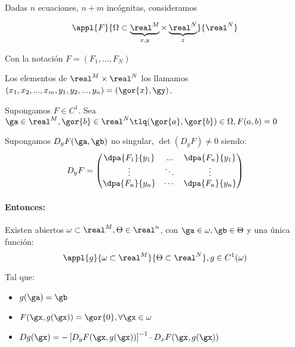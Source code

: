 \begin{theorem}

Dadas $n$ ecuaciones, $n+m$ incógnitas, consideramos 

$$\appl{F}{\Omega\subset\underbrace{\real^M}_{x,y} \times \underbrace{\real^N}_{z}}{\real^N}$$

Con la notación $F = (F_1,...,F_N)$

Los elementos de $\real^M\times\real^N$ los llamamos $(x_1,x_2,...,x_m,y_1,y_2,...,y_n) = (\gor{x},\gy)$.

Supongamos $F\in C^1$. Sea $\ga \in \real^M, \gor{b} \in \real^N \tlq (\gor{a},\gor{b})\in \Omega , F(a,b)=0$

Supongamos $D_yF(\ga,\gb)$ no singular, $\det(D_yF)\neq 0$ siendo:
$$D_yF = \begin{pmatrix}
          \dpa{F_1}{y_1}&...&\dpa{F_n}{y_1}\\
          \vdots&\ddots&\vdots\\
          \dpa{F_n}{y_n}&\cdots&\dpa{F_n}{y_n}
         \end{pmatrix}$$
         
\paragraph{Entonces:} Existen abiertos $\omega \subset \real^M, \Theta \in\real^n$, con $\ga \in \omega, \gb \in \Theta$ y una única función: \[ \appl{g}{\omega\subset\real^M}{\Theta \subset\real^N}, g\in C^1(\omega) \]

Tal que:
\begin{itemize}
 \item $g(\ga) = \gb$
 \item $F(\gx,g(\gx)) = \gor{0}, \forall \gx \in \omega$
 \item $\displaystyle Dg(\gx) = - \left[D_yF(\gx,g(\gx))\right]^{-1} \cdot D_xF(\gx,g(\gx))$
\end{itemize}
\end{theorem}


